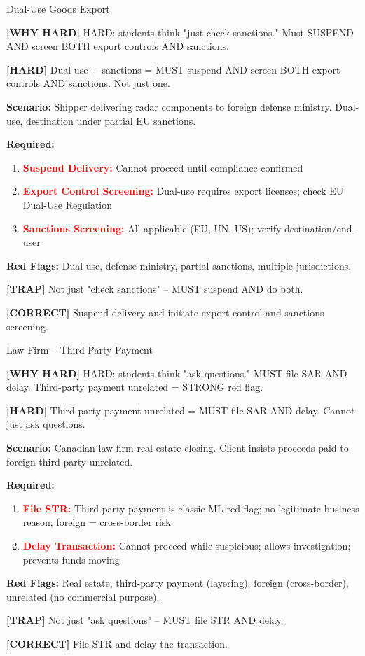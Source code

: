 \documentclass[6pt,aspectratio=169,fontsize=5pt]{beamer}
\renewcommand{\tiny}{\fontsize{3.5pt}{4.5pt}\selectfont}
\renewcommand{\normalsize}{\fontsize{7.5pt}{8.5pt}\selectfont}
\newcommand{\trap}[1]{%
	\begin{block}{\textcolor{redtrap}{\textbf{[TRAP]}}}
		\textcolor{redtrap}{\tiny #1}
	\end{block}
}
\newcommand{\correct}[1]{%
	\begin{block}{\textcolor{greencorrect}{\textbf{[CORRECT]}}}
		\textcolor{greencorrect}{\tiny #1}
	\end{block}
}
\newcommand{\hard}[1]{%
	\begin{block}{\textcolor{hardcolor}{\textbf{[HARD]}}}
		\textcolor{hardcolor}{\tiny #1}
	\end{block}
}
\newcommand{\hardexplain}[1]{%
	\begin{block}{\textcolor{orangehard}{\textbf{[WHY HARD]}}}
		\textcolor{orangehard}{\tiny #1}
	\end{block}
}
\begin{document}
	\begin{frame}{\normalsize Dual-Use Goods Export}
		
		\hardexplain{HARD: students think "just check sanctions." Must SUSPEND AND screen BOTH export controls AND sanctions.}
		
		\hard{Dual-use + sanctions = MUST suspend AND screen BOTH export controls AND sanctions. Not just one.}
		
		\textbf{Scenario:} Shipper delivering radar components to foreign defense ministry. Dual-use, destination under partial EU sanctions.
		
		\textbf{Required:}
		\begin{enumerate}
			\item \textcolor{red}{\textbf{Suspend Delivery:}} Cannot proceed until compliance confirmed
			\item \textcolor{red}{\textbf{Export Control Screening:}} Dual-use requires export licenses; check EU Dual-Use Regulation
			\item \textcolor{red}{\textbf{Sanctions Screening:}} All applicable (EU, UN, US); verify destination/end-user
		\end{enumerate}
		
		\textbf{Red Flags:} Dual-use, defense ministry, partial sanctions, multiple jurisdictions.
		
		\trap{Not just "check sanctions" -- MUST suspend AND do both.}
		
		\correct{Suspend delivery and initiate export control and sanctions screening.}
	\end{frame}
	
	\begin{frame}{\normalsize Law Firm -- Third-Party Payment}
		
		\hardexplain{HARD: students think "ask questions." MUST file SAR AND delay. Third-party payment unrelated = STRONG red flag.}
		
		\hard{Third-party payment unrelated = MUST file SAR AND delay. Cannot just ask questions.}
		
		\textbf{Scenario:} Canadian law firm real estate closing. Client insists proceeds paid to foreign third party unrelated.
		
		\textbf{Required:}
		\begin{enumerate}
			\item \textcolor{red}{\textbf{File STR:}} Third-party payment is classic ML red flag; no legitimate business reason; foreign = cross-border risk
			\item \textcolor{red}{\textbf{Delay Transaction:}} Cannot proceed while suspicious; allows investigation; prevents funds moving
		\end{enumerate}
		
		\textbf{Red Flags:} Real estate, third-party payment (layering), foreign (cross-border), unrelated (no commercial purpose).
		
		\trap{Not just "ask questions" -- MUST file STR AND delay.}
		
		\correct{File STR and delay the transaction.}
	\end{frame}
	
\end{document}

